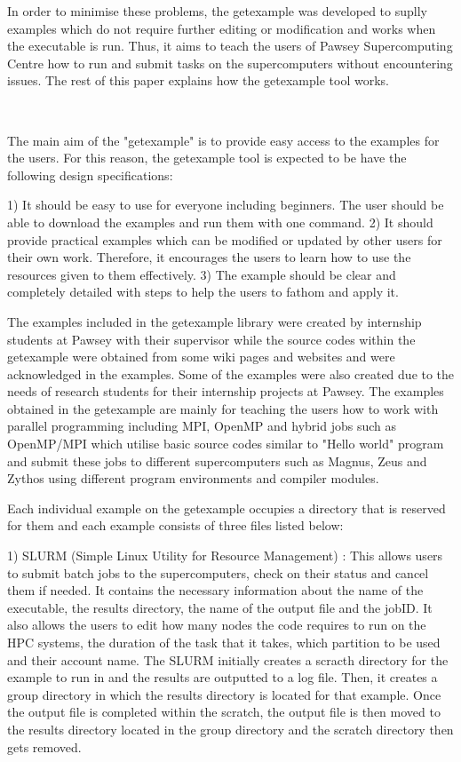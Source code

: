 \begin{Document}
{\begin{Introduction}
In order to minimise these problems, the getexample was developed to suplly examples which do not require further editing or modification and works
when the executable is run. Thus, it aims to teach the users of Pawsey Supercomputing Centre how to run and submit tasks on the supercomputers without 
encountering issues. The rest of this paper explains how the getexample tool works.   


\end{Introduction}
\
\

The main aim of the "getexample" is to provide easy access to the examples for the users. For this reason, the getexample tool is expected to be have the 
following design specifications:

1) It should be easy to use for everyone including beginners. The user should be able to download the examples and run them with one command.
2) It should provide practical examples which can be modified or updated by other users for their own work. Therefore, it encourages the users to learn
how to use the resources given to them effectively.
3) The example should be clear and completely detailed with steps to help the users to fathom and apply it.

\Section{Creating Examples on getexample}

The examples included in the getexample library were created by internship students at Pawsey with their supervisor while the source codes within the
getexample were obtained from some wiki pages and websites and were acknowledged in the examples. Some of the examples were also created due to the
needs of research students for their internship projects at Pawsey. The examples obtained in the getexample are mainly for teaching the users how to work
with parallel programming including MPI, OpenMP and hybrid jobs such as OpenMP/MPI which utilise basic source codes similar to "Hello world" program and
submit these jobs to different supercomputers such as Magnus, Zeus and Zythos using different program environments and compiler modules. 

Each individual example on the getexample occupies a directory that is reserved for them and each example consists of three files listed below:
    
1) SLURM (Simple Linux Utility for Resource Management) : This allows users to submit batch jobs to the supercomputers, check on their status and cancel 
them if needed. It contains the necessary information about the name of the executable, the results directory, the name of the output file and the jobID. 
It also allows the users to edit how many nodes the code requires to run on the HPC systems, the duration of the task that it takes, which partition to
be used and their account name. The SLURM initially creates a scracth directory for the example to run in and the results are outputted to a log file. 
Then, it creates a group directory in which the results directory is located for that example. Once the output file is completed within the 
scratch, the output file is then moved to the results directory located in the group directory and the scratch directory then gets removed.

}
\end{Document}
